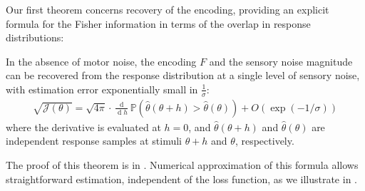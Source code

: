 Our first theorem concerns recovery of the encoding, providing an explicit formula for the Fisher information in terms of the overlap in response distributions:



\begin{thm*} %
    In the absence of motor noise, the encoding $F$ and the sensory noise magnitude can be recovered from the response distribution at a single level of sensory noise, with estimation error exponentially small in $\frac{1}{\sigma}$:
\begin{align*}
 \sqrt{\mathcal{J}(\theta)} = \sqrt{4\pi} \cdot \frac{\operatorname{d}}{\operatorname{d}h} \mathbb{P}\left(\widehat{\theta}(\theta+h) > \widehat{\theta}(\theta)\right) + O(\exp(-1/\sigma))
\end{align*}
where the derivative is evaluated at $h=0$, and $\widehat{\theta}(\theta+h)$ and $\widehat{\theta}(\theta)$ are independent response samples at stimuli $\theta+h$ and $\theta$, respectively.
%
\end{thm*}
The proof of this theorem is in .
Numerical approximation of this formula allows straightforward estimation, independent of the loss function, as we illustrate in .



